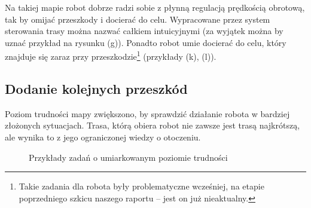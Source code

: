 \documentclass[11pt]{article}
\begin{document}
Na takiej mapie robot dobrze radzi sobie z płynną regulacją prędkością obrotową, tak by omijać przeszkody i docierać do celu. Wypracowane przez system sterowania trasy można nazwać całkiem intuicyjnymi (za wyjątek można by uznać przykład na rysunku (g)). Ponadto robot umie docierać do celu, który znajduje się zaraz przy przeszkodzie\footnote{Takie zadania dla robota były problematyczne wcześniej, na etapie poprzedniego szkicu naszego raportu -- jest on już nieaktualny.} (przykłady (k), (l)).

\newpage

\subsection{Dodanie kolejnych przeszkód}

Poziom trudności mapy zwiększono, by sprawdzić działanie robota w bardziej złożonych sytuacjach. Trasa, którą obiera robot nie zawsze jest trasą najkrótszą, ale wynika to z jego ograniczonej wiedzy o otoczeniu.

\begin{figure}[h!]
	\centering
	
	\hfill
	\hfill
	\hfill
	
	\hfill
	\hfill
	\hfill
	
	\hfill
	\hfill
	\hfill
	
	\caption{Przykłady zadań o umiarkowanym poziomie trudności}
\end{figure}
\end{document}
